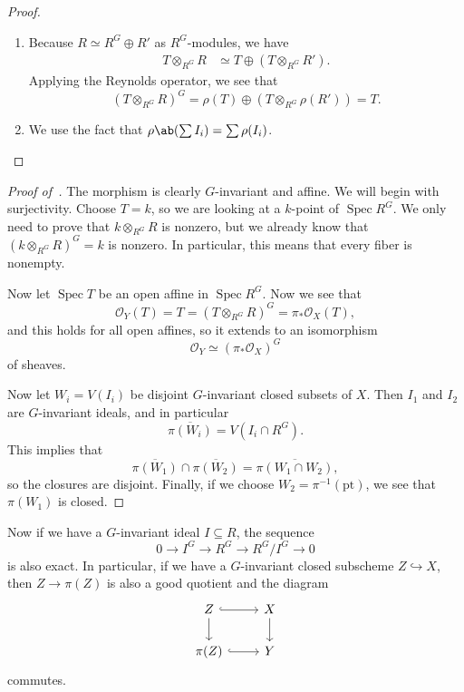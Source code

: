 \documentclass{amsart}
\theoremstyle{definition}
\theoremstyle{remark}
\theoremstyle{plain}
\theoremstyle{definition}
\theoremstyle{remark}
\newcommand{\mc}[1]{\mathcal{#1}}
\newcommand{\mr}[1]{\mathrm{#1}}
\newcommand{\ol}[1]{\overline{#1}}
\newcommand{\1}{\mathbf{1}}
\newcommand{\2}{\mathbf{2}}
\newcommand{\3}{\mathbf{3}}
\DeclareMathOperator{\Spec}{Spec}
\begin{document}
\begin{proof}\leavevmode
    \begin{enumerate}
        \item Because \(R \simeq R^G \oplus R'\) as \(R^G\)-modules, we have
        \begin{align*}
            T \otimes_{R^G} R &\simeq T \oplus (T \otimes_{R^G} R').
        \end{align*}
        Applying the Reynolds operator, we see that
        \[ (T \otimes_{R^G} R)^G = \rho(T) \oplus (T \otimes_{R^G} \rho(R')) = T. \]
        \item We use the fact that \(\rho \ab(\sum I_i) = \sum \rho(I_i)\). \qedhere
    \end{enumerate}
\end{proof}

\begin{proof}[Proof of~]
    The morphism is clearly \(G\)-invariant and affine. We will begin with surjectivity. Choose \(T = k\), so we are looking at a \(k\)-point of \(\Spec R^G\). We only need to prove that \(k \otimes_{R^G} R\) is nonzero, but we already know that \((k \otimes_{R^G} R)^G = k\) is nonzero. In particular, this means that every fiber is nonempty.

    Now let \(\Spec T\) be an open affine in \(\Spec R^G\). Now we see that
    \[ \mc{O}_Y(T) = T = (T \otimes_{R^G} R)^G = \pi_* \mc{O}_X(T), \]
    and this holds for all open affines, so it extends to an isomorphism
    \[ \mc{O}_Y \simeq (\pi_* \mc{O}_X)^G \]
    of sheaves.

    Now let \(W_i = V(I_i)\) be disjoint \(G\)-invariant closed subsets of \(X\). Then \(I_1\) and \(I_2\) are \(G\)-invariant ideals, and in particular
    \[ \ol{\pi (W_i)} = V(I_i \cap R^G). \]
    This implies that
    \[ \ol{\pi (W_1)} \cap \ol{\pi(W_2)} = \ol{\pi(W_1 \cap W_2)}, \]
    so the closures are disjoint. Finally, if we choose \(W_2 = \pi^{-1}(\mr{pt})\), we see that \(\pi(W_1)\) is closed.
\end{proof}

Now if we have a \(G\)-invariant ideal \(I \subseteq R\), the sequence
\[ 0 \to I^G \to R^G \to R^G/I^G \to 0 \]
is also exact. In particular, if we have a \(G\)-invariant closed subscheme \(Z \hookrightarrow X\), then \(Z \to \pi(Z)\) is also a good quotient and the diagram
\begin{equation*}
\begin{tikzcd}
    Z \ar[hookrightarrow]{r} \ar{d} & X \ar{d} \\
    \pi(Z) \ar[hookrightarrow]{r} & Y
\end{tikzcd}
\end{equation*}
commutes.
\end{document}
